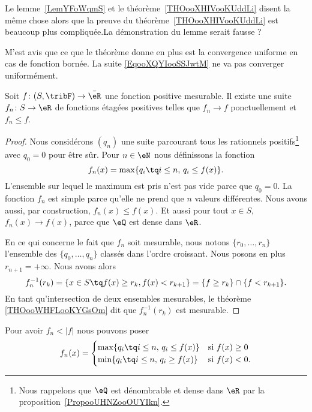 \begin{probleme}
	Le lemme~\ref{LemYFoWqmS} et le théorème~\ref{THOooXHIVooKUddLi} disent la même chose alors que la preuve du théorème~\ref{THOooXHIVooKUddLi} est beaucoup plus compliquée.La démonstration du lemme serait fausse ?

	M'est avis que ce que le théorème donne en plus est la convergence uniforme en cas de fonction bornée. La suite \eqref{EqooXQYIooSSJwtM} ne va pas converger uniformément.
\end{probleme}

\begin{lemma}    \label{LemYFoWqmS}
	Soit \( f\colon (S,\tribF)\to \bar\eR\) une fonction positive mesurable. Il existe une suite \( f_n\colon S\to \eR\) de fonctions étagées positives telles que \( f_n\to f\) ponctuellement et \( f_n \leq f\).
\end{lemma}

\begin{proof}
	Nous considérons \( (q_n)\) une suite parcourant tous les rationnels positifs\footnote{Nous rappelons que \( \eQ\) est dénombrable et dense dans \( \eR\) par la proposition~\ref{PropooUHNZooOUYIkn}.} avec \( q_0=0\) pour être sûr.
	Pour \( n\in \eN\) nous définissons la fonction
	\begin{equation}        \label{EqooXQYIooSSJwtM}
		f_n(x)= \max\{ q_i\tq i\leq n,\, q_i\leq f(x) \}.
	\end{equation}
	L'ensemble sur lequel le maximum est pris n'est pas vide parce que \( q_0=0\). La fonction \( f_n\) est simple parce qu'elle ne prend que \( n\) valeurs différentes. Nous avons aussi, par construction, \(  f_n(x)\leq f(x) \). Et aussi pour tout \( x\in S\), \( f_n(x)\to f(x)\), parce que \( \eQ\) est dense dans \( \eR\).

	En ce qui concerne le fait que \( f_n\) soit mesurable, nous notons \( \{ r_0,\ldots, r_{n} \}\) l'ensemble des \( \{ q_0,\ldots, q_n \}\) classés dans l'ordre croissant. Nous posons en plus \( r_{n+1}=+\infty\). Nous avons alors
	\begin{equation}
		f_n^{-1}(r_k)=\{ x\in S\tq f(x)\geq r_k,f(x)<r_{k+1} \}=\{ f\geq r_k \}\cap\{ f<r_{k+1} \}.
	\end{equation}
	En tant qu'intersection de deux ensembles mesurables, le théorème \ref{THOooWHFLooKYGsOm} dit que \( f_n^{-1}(r_k)\) est mesurable.
\end{proof}

\begin{remark}
	Pour avoir \(  f_n <| f |\) nous pouvons poser
	\begin{equation}
		f_n(x)=\begin{cases}
			\max\{ q_i\tq i\leq n,\, q_i\leq f(x) \} & \text{si } f(x)\geq 0      \\
			\min\{ q_i\tq i\leq n,\, q_i\geq f(x) \} & \text{si } f(x)< 0\text{.}
		\end{cases}
	\end{equation}
\end{remark}

